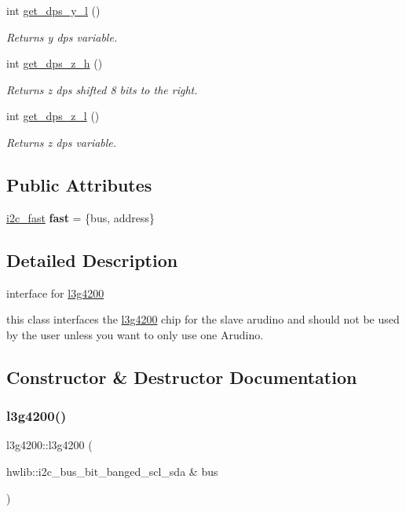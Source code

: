 \begin{DoxyCompactItemize}
int \hyperlink{classl3g4200_adcd400fc92347bad573f020b151e9fb5}{get\+\_\+dps\+\_\+y\+\_\+l} ()
\begin{DoxyCompactList}\small\item\em Returns y dps variable. \end{DoxyCompactList}\item 
int \hyperlink{classl3g4200_ac2b63c3b1af1862adbbe96d4166b3e38}{get\+\_\+dps\+\_\+z\+\_\+h} ()
\begin{DoxyCompactList}\small\item\em Returns z dps shifted 8 bits to the right. \end{DoxyCompactList}\item 
int \hyperlink{classl3g4200_a3ff13048a18eed7c7f03ae50a3bc68bf}{get\+\_\+dps\+\_\+z\+\_\+l} ()
\begin{DoxyCompactList}\small\item\em Returns z dps variable. \end{DoxyCompactList}\end{DoxyCompactItemize}
\subsection*{Public Attributes}
\begin{DoxyCompactItemize}
\item 
\mbox{\label{classl3g4200_a85345b78a1d99a87a182e6c93d23fbd8}} 
\hyperlink{classi2c__fast}{i2c\+\_\+fast} {\bfseries fast} = \{bus, address\}
\end{DoxyCompactItemize}


\subsection{Detailed Description}
interface for \hyperlink{classl3g4200}{l3g4200} 

this class interfaces the \hyperlink{classl3g4200}{l3g4200} chip for the slave arudino and should not be used by the user unless you want to only use one Arudino. 

\subsection{Constructor \& Destructor Documentation}
\mbox{\label{classl3g4200_a95f0b60d26992cb2ee03730f38fa3308}} 
\subsubsection{\texorpdfstring{l3g4200()}{l3g4200()}\hspace{0.1cm}{\footnotesize\ttfamily [1/2]}}
{\footnotesize\ttfamily l3g4200\+::l3g4200 (\begin{DoxyParamCaption}\item[{hwlib\+::i2c\+\_\+bus\+\_\+bit\+\_\+banged\+\_\+scl\+\_\+sda \&}]{bus }\end{DoxyParamCaption})\hspace{0.3cm}{\ttfamily [inline]}}



